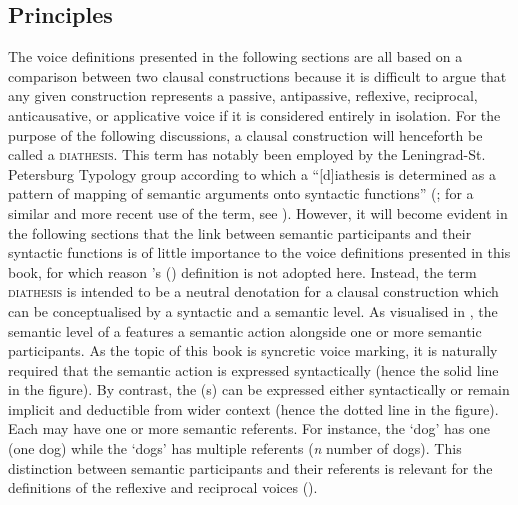 \subsection{Principles} \label{def:principles}
The voice definitions presented in the following sections are all based on a comparison between two clausal constructions because it is difficult to argue that any given construction represents a passive, antipassive, reflexive, reciprocal, anticausative, or applicative voice if it is considered entirely in isolation. For the purpose of the following discussions, a clausal construction will henceforth be called a \textsc{diathesis}. This term has notably been employed by the Leningrad-St. Petersburg Typology group according to which a “[d]iathesis is determined as a pattern of mapping of semantic arguments onto syntactic functions” (\citealt[370]{kulikov:2010}; for a similar and more recent use of the term, see \citealt[4]{zuniga:kittila:2019}). However, it will become evident in the following sections that the link between semantic participants and their syntactic functions is of little importance to the voice definitions presented in this book, for which reason \citeauthor{kulikov:2010}’s (\citeyear{kulikov:2010}) definition is not adopted here. Instead, the term \textsc{diathesis} is intended to be a neutral denotation for a clausal construction which can be conceptualised by a syntactic and a semantic level. As visualised in , the semantic level of a  features a semantic action alongside one or more semantic participants. As the topic of this book is syncretic voice marking, it is naturally required that the semantic action is expressed syntactically (hence the solid line in the figure). By contrast, the (s) can be expressed either syntactically or remain implicit and deductible from wider context (hence the dotted line in the figure). Each  may have one or more semantic referents. For instance, the  ‘dog’ has one  (one dog) while the  ‘dogs’ has multiple referents (\textit{n} number of dogs). This distinction between semantic participants and their referents is relevant for the definitions of the reflexive and reciprocal voices ().

